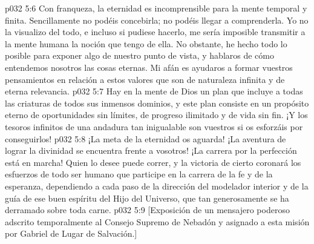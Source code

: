 \vs p032 5:6 Con franqueza, la eternidad es incomprensible para la mente temporal y finita. Sencillamente no podéis concebirla; no podéis llegar a comprenderla. Yo no la visualizo del todo, e incluso si pudiese hacerlo, me sería imposible transmitir a la mente humana la noción que tengo de ella. No obstante, he hecho todo lo posible para exponer algo de nuestro punto de vista, y hablaros de cómo entendemos nosotros las cosas eternas. Mi afán es ayudaros a formar vuestros pensamientos en relación a estos valores que son de naturaleza infinita y de eterna relevancia.
\vs p032 5:7 \pc Hay en la mente de Dios un plan que incluye a todas las criaturas de todos sus inmensos dominios, y este plan consiste en un propósito eterno de oportunidades sin límites, de progreso ilimitado y de vida sin fin. ¡Y los tesoros infinitos de una andadura tan inigualable son vuestros si os esforzáis por conseguirlos!
\vs p032 5:8 ¡La meta de la eternidad os aguarda! ¡La aventura de lograr la divinidad se encuentra frente a vosotros! ¡La carrera por la perfección está en marcha! Quien lo desee puede correr, y la victoria de cierto coronará los esfuerzos de todo ser humano que participe en la carrera de la fe y de la esperanza, dependiendo a cada paso de la dirección del modelador interior y de la guía de ese buen espíritu del Hijo del Universo, que tan generosamente se ha derramado sobre toda carne.
\vsetoff
\vs p032 5:9 [Exposición de un mensajero poderoso adscrito temporalmente al Consejo Supremo de Nebadón y asignado a esta misión por Gabriel de Lugar de Salvación.]
